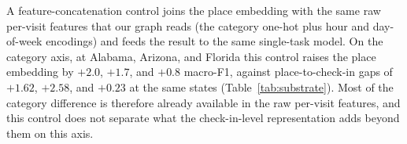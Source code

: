 A feature-concatenation control joins the place embedding with the same raw
per-visit features that our graph reads (the category one-hot plus hour and
day-of-week encodings) and feeds the result to the same single-task model. On
the category axis, at Alabama, Arizona, and Florida this control raises the
place embedding by $+2.0$, $+1.7$, and $+0.8$ macro-F1, against
place-to-check-in gaps of $+1.62$, $+2.58$, and $+0.23$ at the same states
(Table~\ref{tab:substrate}). Most of the category difference is
therefore already available in the raw per-visit features, and this control does not separate
what the check-in-level representation adds beyond them on this axis.


